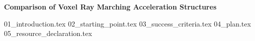 \documentclass[12pt]{report}
\begin{document}
\begin{center}
  \Large\textbf{Comparison of Voxel Ray Marching Acceleration Structures}
\end{center}

{01_introduction.tex}
{02_starting_point.tex}
{03_success_criteria.tex}
{04_plan.tex}
{05_resource_declaration.tex}

\printbibliography{}
\end{document}
